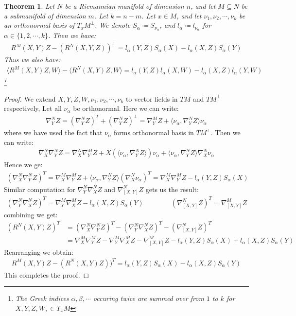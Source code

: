 \documentclass[11pt]{book}
\theoremstyle{break}
\theoremstyle{break}
\newtheorem{thm}{Theorem}[section]
\begin{document}
\begin{thm}
Let $N$ be a Riemannian manifold of dimension $n$, and let $M \subseteq N$ be a submanifold of dimension $m$. Let $k = n-m$. Let $x \in M$, and let $\nu_1,\nu_2,\cdots,\nu_k$ be an orthonormal basis of $T_xM^{\perp}$. We denote $S_\alpha \coloneqq S_{\nu_\alpha}$, and $l_\alpha \coloneqq l_{\nu_\alpha}$ for $\alpha \in \{1,2,\cdots, k\}$. Then we have:
\begin{align*}
R^M(X,Y)Z -( R^N(X,Y,Z))^{\perp} = l_\alpha (Y,Z) S_{\alpha}(X) - l_\alpha(X,Z) S_\alpha(Y)
\end{align*}
Thus we also have:
\begin{align*}
\langle R^M(X,Y)Z,W\rangle - \langle R^N(X,Y)Z,W\rangle = l_\alpha(Y,Z)l_\alpha(X,W) - l_\alpha(X,Z)l_\alpha(Y,W)
\end{align*}
\footnote{The Greek indices $\alpha,\beta,\cdots$ occuring twice are summed over from $1$ to $k$ for $X,Y,Z,W, \in T_xM$}
\end{thm}
\begin{proof}
We extend $X,Y,Z,W,\nu_1,\nu_2,\cdots, \nu_k$ to vector fields in $TM$ and $TM^{\perp}$ respectively, Let all $\nu_\alpha$ be orthonormal. Here we can write:
\begin{align*}
\nabla_Y^NZ = \left(\nabla_Y^NZ\right)^T + \left(\nabla_Y^NZ\right)^{\perp} = \nabla_Y^MZ + \langle \nu_\alpha, \nabla_Y^NZ\rangle \nu_\alpha
\end{align*}
where we have used the fact that $\nu_\alpha$ forms orthonormal basis in $TM^{\perp}$.  Then we can write:
\begin{align*}
\nabla_X^N\nabla_Y^NZ = \nabla_X^N\nabla_Y^MZ + X(\langle \nu_\alpha , \nabla_Y^NZ\rangle ) \nu_\alpha + \langle \nu_\alpha, \nabla_Y^N Z\rangle \nabla_X^N\nu_\alpha
\end{align*}
Hence we ge:
\begin{align*}
\left( \nabla_X^N\nabla_Y^NZ\right)^T = \nabla_X^M\nabla_Y^MZ +\langle \nu_\alpha, \nabla_Y^NZ\rangle \left( \nabla_X^N \nu_\alpha\right)^T=\nabla_X^M\nabla_Y^MZ -l_\alpha(Y,Z)S_\alpha(X)
\end{align*}
Similar computation for $\nabla_Y^N\nabla_X^NZ$ and $\nabla_{[X,Y]}^NZ$ gets us the result:
\begin{align*}
\left( \nabla_Y^N\nabla_X^NZ\right)^T = \nabla_Y^M\nabla_X^M Z - l_\alpha(X,Z) S_\alpha(Y) \qquad\qquad \left( \nabla_{[X,Y]}^N Z\right)^T = \nabla_{[X,Y]}^M Z
\end{align*}
combining we get:
\begin{align*}
(R^N(X,Y)Z)^T  &= \left( \nabla_X^N\nabla_Y^NZ\right)^T - \left(\nabla_Y^N\nabla_X^NZ\right)^T - \left(\nabla_{[X,Y]}^NZ\right)^T\\
&= \nabla_X^M\nabla_Y^MZ - \nabla_Y^M\nabla_X^MZ - \nabla_{[X,Y]}^MZ - l_\alpha(Y,Z)S_\alpha(X)+ l_\alpha(X,Z)S_\alpha(Y)
\end{align*}
Rearranging we obtain:
\begin{align*}
R^M(X,Y)Z - (R^N(X,Y)Z))^T=  l_\alpha(Y,Z)S_\alpha(X)- l_\alpha(X,Z)S_\alpha(Y)
\end{align*}
This completes the proof. 
\end{proof}
\end{document}
